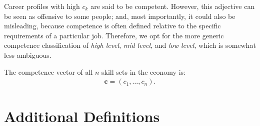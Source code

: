 \documentclass{elsarticle} %
\begin{document}
Career profiles with high $c_k$ are said to be competent. However, this
adjective can be seen as offensive to some people; and, most importantly, it
could also be misleading, because competence is often defined relative to the
specific requirements of a particular job. Therefore, we opt for the more
generic competence classification of \textit{high level}, \textit{mid level},
and \textit{low level}, which is somewhat less ambiguous.

The competence vector of all $n$ skill sets in the economy is:
\begin{gather}
    \boldsymbol{c} = (c_1, \dots, c_n)
    .
\end{gather}


\section{Additional Definitions}
\end{document}
